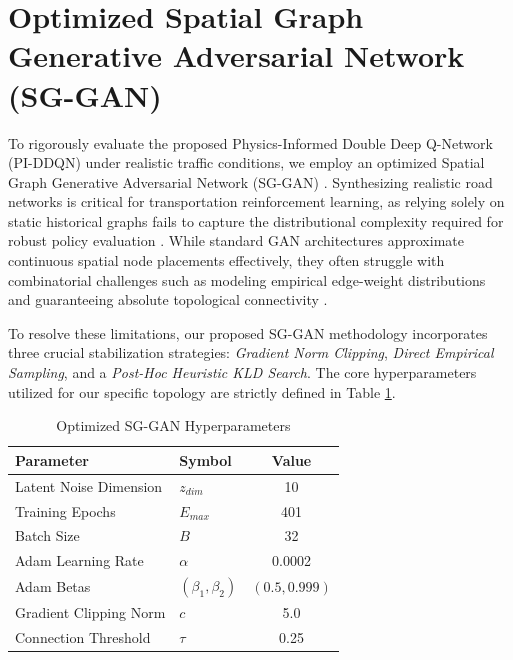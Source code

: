 \documentclass{article}
\begin{document}
\section{Optimized Spatial Graph Generative Adversarial Network (SG-GAN)}
\label{sec:sg_gan}

To rigorously evaluate the proposed Physics-Informed Double Deep Q-Network (PI-DDQN) under realistic traffic conditions, we employ an optimized Spatial Graph Generative Adversarial Network (SG-GAN) \cite{das2025sggan}. Synthesizing realistic road networks is critical for transportation reinforcement learning, as relying solely on static historical graphs fails to capture the distributional complexity required for robust policy evaluation \cite{kaufmann2020}. While standard GAN architectures \cite{goodfellow2014generative} approximate continuous spatial node placements effectively, they often struggle with combinatorial challenges such as modeling empirical edge-weight distributions and guaranteeing absolute topological connectivity \cite{you2018graphrnn, decao2018molgan}.

To resolve these limitations, our proposed SG-GAN methodology incorporates three crucial stabilization strategies: \textit{Gradient Norm Clipping}, \textit{Direct Empirical Sampling}, and a \textit{Post-Hoc Heuristic KLD Search}. The core hyperparameters utilized for our specific topology are strictly defined in Table \ref{tab:gan_params}.

\begin{table}[ht]
\centering
\caption{Optimized SG-GAN Hyperparameters}
\label{tab:gan_params}
\begin{tabular}{@{}llc@{}}
\toprule
\textbf{Parameter} & \textbf{Symbol} & \textbf{Value} \\ \midrule
Latent Noise Dimension & $z_{dim}$ & 10 \\
Training Epochs & $E_{max}$ & 401 \\
Batch Size & $B$ & 32 \\
Adam Learning Rate & $\alpha$ & 0.0002 \\
Adam Betas & $(\beta_1, \beta_2)$ & $(0.5, 0.999)$ \\
Gradient Clipping Norm & $c$ & 5.0 \\
Connection Threshold & $\tau$ & 0.25 \\ \bottomrule
\end{tabular}
\end{table}
\end{document}
